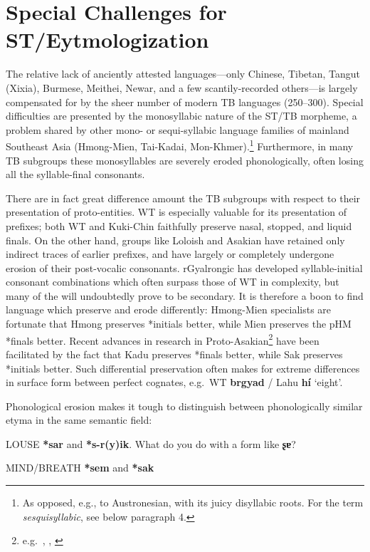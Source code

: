 \section{Special Challenges for ST/Eytmologization}

The relative lack of anciently attested languages—only Chinese, Tibetan, Tangut (Xixia), Burmese, Meithei, Newar, and a few scantily-recorded others—is largely compensated for by the sheer number of modern TB languages (250–300). Special difficulties are presented by the monosyllabic nature of the ST/TB morpheme, a problem shared by other mono- or sequi-syllabic language families of mainland Southeast Asia (Hmong-Mien, Tai-Kadai, Mon-Khmer).\footnote{As opposed, e.g., to Austronesian, with its juicy disyllabic roots. For the term \textit{sesquisyllabic}, see below paragraph 4.}
Furthermore, in many TB subgroups these monosyllables are severely eroded phonologically, often losing all the syllable-final consonants.

There are in fact great difference amount the TB subgroups with respect to their presentation of proto-entities. WT is especially valuable for its presentation of prefixes; both WT and Kuki-Chin faithfully preserve nasal, stopped, and liquid finals. On the other hand, groups like Loloish and Asakian have retained only indirect traces of earlier prefixes, and have largely or completely undergone erosion of their post-vocalic consonants.
rGyalrongic has developed syllable-initial consonant combinations which often surpass those of WT in complexity, but many of the will undoubtedly prove to be secondary.
It is therefore a boon to find language which preserve and erode differently: Hmong-Mien specialists are fortunate that Hmong preserves *initials better, while Mien preserves the pHM *finals better.
Recent advances in research in Proto-Asakian\footnote{e.g.\ \citealt{HK-Sak}, \citealt{DS-Kadu}, \citealt{JAM-RGPJ}} have been facilitated by the fact that Kadu preserves *finals better, while Sak preserves *initials better.
Such differential preservation often makes for extreme differences in surface form between perfect cognates, e.g.\ WT \textbf{brgyad} / Lahu \textbf{hí} ‘eight’.

Phonological erosion makes it tough to distinguish between phonologically similar etyma in the same semantic field:

LOUSE \textbf{*sar} and \textbf{*s-r(y)ik}. What do you do with a form like \textbf{ʂɐ}?

MIND/BREATH \textbf{*sem} and \textbf{*sak}

